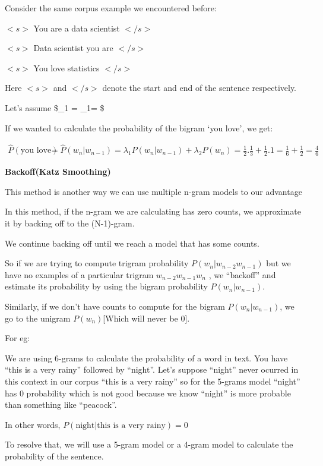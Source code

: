 \documentclass[11pt]{article}
\begin{document}
Consider the same corpus example we encountered before:

\(<s>\) You are a data scientist \(</s>\)

\(<s>\) Data scientist you are \(</s>\)

\(<s>\) You love statistics \(</s>\)

Here \(<s>\) and \(</s>\) denote the start and end of the sentence
respectively.

Let's assume \$\lambda\_1 = \lambda\_1=  \$

If we wanted to calculate the probability of the bigram `you love', we
get:

\begin{align} \hat{P}(\text{you love})&=\hat{P}(w_n | w_{n−1}) = \lambda_1 P(w_n | w_{n−1}) + \lambda_2 P(w_n) = \frac{1}{2}.\frac{1}{3} + \frac{1}{2}.1 =\frac{1}{6} + \frac{1}{2} =\frac{4}{6} \end{align}

\textbf{Backoff(Katz Smoothing)}

This method is another way we can use multiple n-gram models to our
advantage

In this method, if the n-gram we are calculating has zero counts, we
approximate it by backing off to the (N-1)-gram.

We continue backing off until we reach a model that has some counts.

So if we are trying to compute trigram probability
\(P(w_n |w_{n−2} w_{n−1})\) but we have no examples of a particular
trigram \(w_{n−2} w_{n−1} w_n\) , we ``backoff'' and estimate its
probability by using the bigram probability \(P(w_n |w_{n−1})\).

Similarly, if we don't have counts to compute for the bigram
\(P(w_n|w_{n−1})\), we go to the unigram \(P(w_n)\){[}Which will never
be 0{]}.

For eg:

We are using 6-grams to calculate the probability of a word in text. You
have ``this is a very rainy'' followed by ``night''. Let's suppose
``night'' never ocurred in this context in our corpus ``this is a very
rainy'' so for the 5-grams model ``night'' has 0 probability which is
not good because we know ``night'' is more probable than something like
``peacock''.

In other words, \(P(\text{night|this is a very rainy})=0\)

To resolve that, we will use a 5-gram model or a 4-gram model to
calculate the probability of the sentence.
\end{document}

